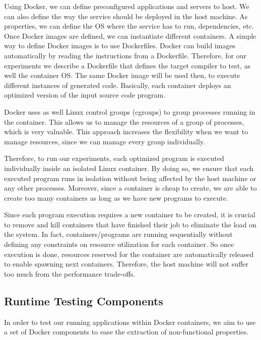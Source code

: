 Using Docker, we can define preconfigured applications and servers to host. We can also define the way the service should be deployed in the host machine. 
As properties, we can define the OS where the service has to run, dependencies, etc. Once Docker images are defined, we can instantiate different containers.
A simple way to define Docker images is to use Dockerfiles. Docker can build images automatically by reading the instructions from a Dockerfile. 
Therefore, for our experiments we describe a Dockerfile that defines the target compiler to test, as well the container OS. The same Docker image will be used then, to execute different instances of generated code. Basically, each container deploys an optimized version of the input source code program.

Docker uses as well Linux control groups (cgroups) to group processes running in the container. This allows us to manage the resources of a group of processes, which is very valuable. 
This approach increases the flexibility when we want to manage resources, since we can manage every group individually. 

Therefore, to run our experiments, each optimized program is executed individually inside an isolated Linux container. By doing so, we ensure that each executed program runs in isolation without being affected by the host machine or any other processes. Moreover, since a container is cheap to create, we are able to create too many containers as long as we have new programs to execute.

Since each program execution requires a new container to be created, it is crucial to remove and kill containers that have finished their job to eliminate the load on the system. In fact, containers/programs are running sequentially without defining any constraints on resource utilization for each container. So once execution is done, resources reserved for the container are automatically released to enable spawning next containers. Therefore, the host machine will not suffer too much from the performance trade-offs.

\subsection{Runtime Testing Components}
In order to test our running applications within Docker containers, we aim to use a set of Docker components to ease the extraction of non-functional properties.
